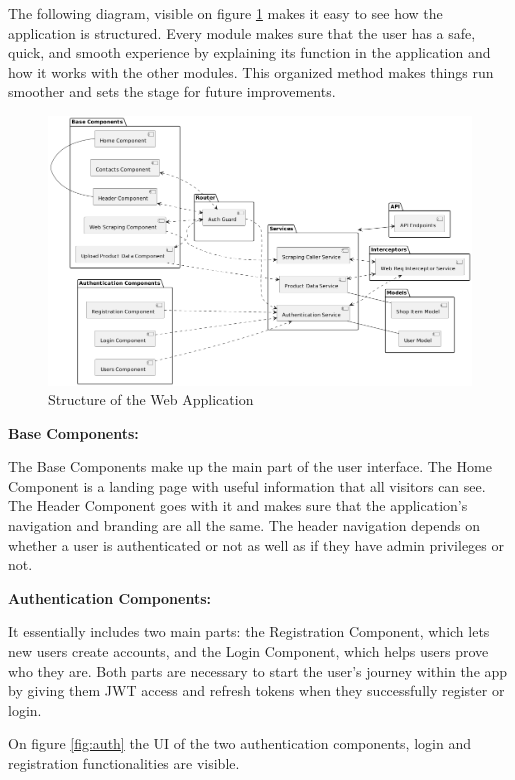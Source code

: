 The following diagram, visible on figure \ref{fig:webappstruct} makes it easy to see how the application is structured. Every module makes sure that the user has a safe, quick, and smooth experience by explaining its function in the application and how it works with the other modules. This organized method makes things run smoother and sets the stage for future improvements.

\begin{figure}[H]
	\centering
	\includegraphics[width=1\linewidth]{img/website_structure.png}
	\caption{Structure of the Web Application}
	\label{fig:webappstruct}
\end{figure}

\noindent\textbf{Base Components: }

The Base Components make up the main part of the user interface. The Home Component is a landing page with useful information that all visitors can see. The Header Component goes with it and makes sure that the application's navigation and branding are all the same. The header navigation depends on whether a user is authenticated or not as well as if they have admin privileges or not. 

\noindent\textbf{Authentication Components:}

It essentially includes two main parts: the Registration Component, which lets new users create accounts, and the Login Component, which helps users prove who they are. Both parts are necessary to start the user's journey within the app by giving them JWT access and refresh tokens when they successfully register or login.

On figure \ref{fig:auth} the UI of the two authentication components, login and registration functionalities are visible. 

